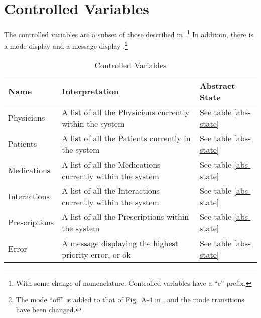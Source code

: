 \section{Controlled Variables}
The controlled variables are a subset of those described in \cite{REMH}.\footnote{With some change of nomenclature. Controlled variables have a ``c'' prefix.} In addition, there is a mode display  and a message display .\footnote{The mode ``off'' is added to that of Fig.~A-4 in \cite{REMH}, and the mode transitions have been changed.}





\begin{table}[h]
\centering
\begin{tabular}{|l|l|l|}
\hline
Name          & Interpretation                                             & Abstract State \\ \hline
Physicians    & A list of all the Physicians currently within the system   & See table \ref{abs-state}  \\ \hline
Patients      & A list of all the Patients currently in the system         & See table \ref{abs-state}  \\ \hline
Medications   & A list of all the Medications currently within the system  & See table \ref{abs-state}  \\ \hline
Interactions  & A list of all the Interactions currently within the system & See table \ref{abs-state}  \\ \hline
Prescriptions & A list of all the Prescriptions within the system          & See table \ref{abs-state}  \\ \hline
Error         & A message displaying the highest priority error, or ok     & See table \ref{abs-state}  \\ \hline
\end{tabular}
\caption {Controlled Variables}
\label{tbl:cv}
\end{table}